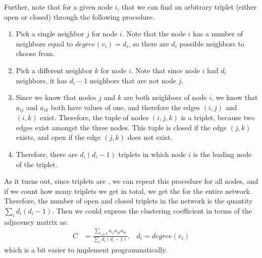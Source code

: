 \documentclass[letterpaper,10pt,english]{jupyterBook}
\begin{document}
\sphinxAtStartPar
Further, note that for a given node \(i\), that we can find an arbitrary triplet (either open or closed) through the following procedure.
\begin{enumerate}
%
\item {} 
\sphinxAtStartPar
Pick a single neighbor \(j\) for node \(i\). Note that the node \(i\) has a number of neighbors equal to \(degree(v_i) = d_i\), so there are \(d_i\) possible neighbors to choose from.

\item {} 
\sphinxAtStartPar
Pick a different neighbor \(k\) for node \(i\). Note that since node \(i\) had \(d_i\) neighbors, it has \(d_i - 1\) neighbors that are not node \(j\).

\item {} 
\sphinxAtStartPar
Since we know that nodes \(j\) and \(k\) are both neighbors of node \(i\), we know that \(a_{ij}\) and \(a_{ik}\) both have values of one, and therefore the edges \((i, j)\) and \((i, k)\) exist. Therefore, the tuple of nodes \((i, j, k)\) is a triplet, because  two edges exist amongst the three nodes. This tuple is closed if the edge \((j, k)\) exists, and open if the edge \((j, k)\) does not exist.

\item {} 
\sphinxAtStartPar
Therefore, there are \(d_i (d_i - 1)\) triplets in which node \(i\) is the leading node of the triplet.

\end{enumerate}

\sphinxAtStartPar
As it turns out, since triplets are , we can repeat this procedure for all nodes, and if we count how many triplets we get in total, we get the  for the entire network. Therefore, the number of open and closed triplets in the network is the quantity \(\sum_i d_i (d_i - 1)\).  Then we could express the clustering coefficient in terms of the adjacency matrix as:
\begin{align*}
    C &= \frac{\sum_{i,j,k}a_{ij}a_{jk}a_{ki}}{\sum_i d_i (d_i - 1)}, \;\;\; d_i = degree(v_i)
\end{align*}
\sphinxAtStartPar
which is a bit easier to implement programmatically.
\end{document}
